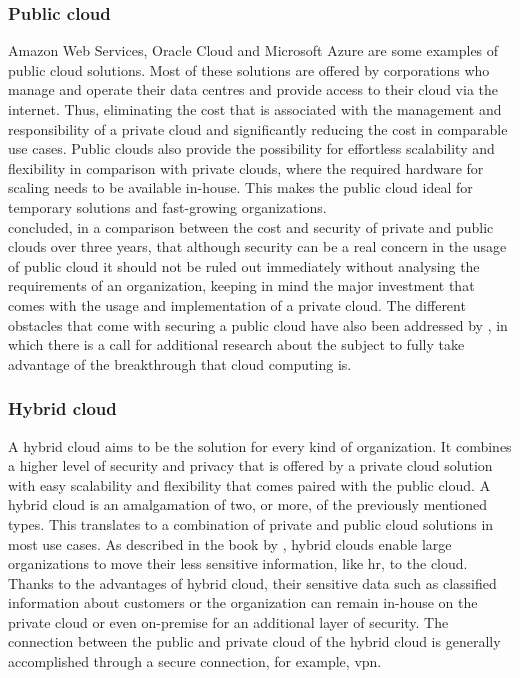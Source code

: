 \subsubsection{Public cloud}
Amazon Web Services, Oracle Cloud and Microsoft Azure are some examples of public cloud solutions. 
Most of these solutions are offered by corporations who manage and operate their data centres and provide access to their cloud via the internet. 
Thus, eliminating the cost that is associated with the management and responsibility of a private cloud and significantly reducing the cost in comparable use cases. 
Public clouds also provide the possibility for effortless scalability and flexibility in comparison with private clouds, where the required hardware for scaling needs to be available in-house. 
This makes the public cloud ideal for temporary solutions and fast-growing organizations.
\\
\textcite{Singh2012} concluded, in a comparison between the cost and security of private and public clouds over three years, that although security can be a real concern in the usage of public cloud it should not be ruled out immediately without analysing the requirements of an organization, keeping in mind the major investment that comes with the usage and implementation of a private cloud.  
The different obstacles that come with securing a public cloud have also been addressed by \textcite{Ren2012}, in which there is a call for additional research about the subject to fully take advantage of the breakthrough that cloud computing is. 

\subsubsection{Hybrid cloud}
A hybrid cloud aims to be the solution for every kind of organization. 
It combines a higher level of security and privacy that is offered by a private cloud solution with easy scalability and flexibility that comes paired with the public cloud. 
A hybrid cloud is an amalgamation of two, or more, of the previously mentioned types. 
This translates to a combination of private and public cloud solutions in most use cases. 
As described in the book by \textcite{Sarna2010}, hybrid clouds enable large organizations to move their less sensitive information, like \acrfull{hr}, to the cloud. 
Thanks to the advantages of hybrid cloud, their sensitive data such as classified information about customers or the organization can remain in-house on the private cloud or even on-premise for an additional layer of security.
The connection between the public and private cloud of the hybrid cloud is generally accomplished through a secure connection, for example, \acrfull{vpn}.


